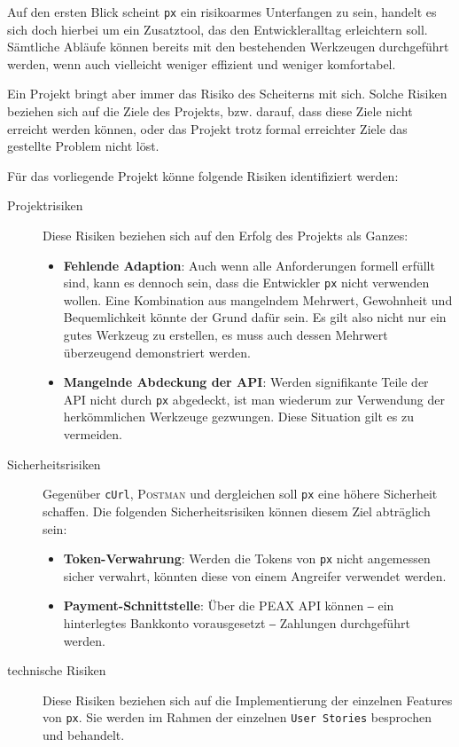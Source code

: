Auf den ersten Blick scheint \texttt{px} ein risikoarmes Unterfangen zu sein, handelt es sich doch hierbei um ein Zusatztool, das den Entwickleralltag erleichtern soll. Sämtliche Abläufe können bereits mit den bestehenden Werkzeugen durchgeführt werden, wenn auch vielleicht weniger effizient und weniger komfortabel.

Ein Projekt bringt aber immer das Risiko des Scheiterns mit sich. Solche Risiken beziehen sich auf die Ziele des Projekts, bzw. darauf, dass diese Ziele nicht erreicht werden können, oder das Projekt trotz formal erreichter Ziele das gestellte Problem nicht löst.

Für das vorliegende Projekt könne folgende Risiken identifiziert werden:

\begin{description}
    \item[Projektrisiken] Diese Risiken beziehen sich auf den Erfolg des Projekts als Ganzes:
        \begin{itemize}
            \item \textbf{Fehlende Adaption}: Auch wenn alle Anforderungen formell erfüllt sind, kann es dennoch sein, dass die Entwickler \texttt{px} nicht verwenden wollen. Eine Kombination aus mangelndem Mehrwert, Gewohnheit und Bequemlichkeit könnte der Grund dafür sein. Es gilt also nicht nur ein gutes Werkzeug zu erstellen, es muss auch dessen Mehrwert überzeugend demonstriert werden.
            \item \textbf{Mangelnde Abdeckung der API}: Werden signifikante Teile der API nicht durch \texttt{px} abgedeckt, ist man wiederum zur Verwendung der herkömmlichen Werkzeuge gezwungen. Diese Situation gilt es zu vermeiden.
        \end{itemize}
    \item[Sicherheitsrisiken] Gegenüber \texttt{cUrl}, \textsc{Postman} und dergleichen soll \texttt{px} eine höhere Sicherheit schaffen. Die folgenden Sicherheitsrisiken können diesem Ziel abträglich sein:
        \begin{itemize}
            \item \textbf{Token-Verwahrung}: Werden die Tokens von \texttt{px} nicht angemessen sicher verwahrt, könnten diese von einem Angreifer verwendet werden.
            \item \textbf{Payment-Schnittstelle}: Über die PEAX API können ‒ ein hinterlegtes Bankkonto vorausgesetzt ‒ Zahlungen durchgeführt werden.
        \end{itemize}
    \item[technische Risiken] Diese Risiken beziehen sich auf die Implementierung der einzelnen Features von \texttt{px}. Sie werden im Rahmen der einzelnen \texttt{User Stories} besprochen und behandelt.
\end{description}
